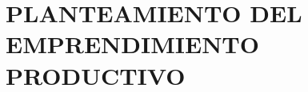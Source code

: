 \chapter{PLANTEAMIENTO DEL EMPRENDIMIENTO PRODUCTIVO}
\label{chap:planteamiento_emprendimiento}




